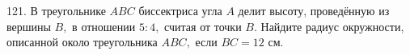 121. В треугольнике $ABC$ биссектриса угла $A$ делит высоту, проведённую из вершины $B,$ в отношении $5:4,$ считая от точки $B.$ Найдите радиус окружности, описанной около треугольника $ABC,$ если $BC=12$ см.\\
